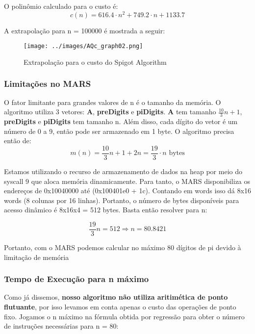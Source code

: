          O polinômio calculado para o custo é:
         \begin{equation}
         	c(n) = 616.4\cdot n^2 + 749.2\cdot n +  1133.7
         \end{equation}
         
         A extrapolação para n = 100000 é mostrada a seguir:
                  \begin{figure}[H]
                 \centering
                 \texttt{[image: ../images/AQc\_graph02.png]}
                \caption{Extrapolação para o custo do Spigot Algorithm}
         \end{figure}
         
     \subsubsection{Limitações no MARS}
     O fator limitante para grandes valores de n é o tamanho da memória. O algoritmo utiliza 3 vetores:\textbf{ A},\textbf{ preDigits} e\textbf{ piDigits}. \textbf{A} tem tamanho $\frac{10}{3}n + 1$, \textbf{preDigits} e \textbf{piDigits} tem tamanho
     n. Além disso, cada dígito do vetor é um número de 0 a 9, então pode ser armazenado em 1 byte. O algoritmo precisa então de:
     \begin{equation}
     		m(n) = \frac{10}{3}n+1 + 2n = \frac{19}{3} \cdot n \mbox{ bytes}
     \end{equation}
     
     Estamos utilizando o recurso de armazenamento de dados na heap por meio do syscall 9 que aloca memória dinamicamente.
     Para tanto, o MARS disponibiliza os endereços de 0x10040000 até (0x100401e0 + 1c). Contando em words isso dá 8x16 words (8 colunas por
     16 linhas). Portanto, o número de bytes disponíveis para acesso dinâmico é 8x16x4 = 512 bytes. Basta então resolver para n:
     
     \begin{equation}
	     \frac{19}{3}n = 512 \Rightarrow n =  80.8421
     \end{equation}
     
     Portanto, com o MARS podemos calcular no máximo 80 dígitos de pi devido à limitação de memória
     
     \subsubsection{Tempo de Execução para n máximo}
     Como já dissemos,\textbf{ nosso algoritmo não utiliza aritimética de ponto flutuante}, por isso levamos em conta apenas o custo
     das operações de ponto fixo. Jogamos o n máximo na fórmula obtida por regressão para obter o número de instruções
     necessárias para n = 80:
     
